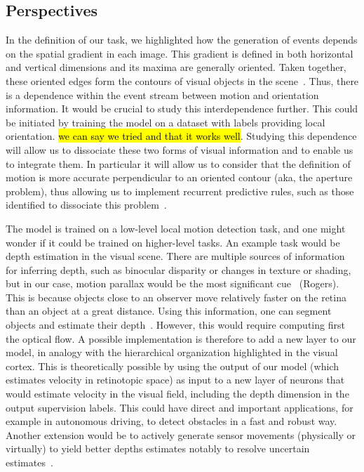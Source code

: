 \documentclass[default]{sn-jnl}%
\theoremstyle{thmstyleone}%
\theoremstyle{thmstyletwo}%
\theoremstyle{thmstylethree}%
\DeclareRobustCommand{\note}[1]{{\sethlcolor{yellow}\hl{#1}}}
\begin{document}
\subsection{Perspectives}
In the definition of our task, we highlighted how the generation of events depends on the spatial gradient in each image. This gradient is defined in both horizontal and vertical dimensions and its maxima are generally oriented. Taken together, these oriented edges form the contours of visual objects in the scene~\citep{koenderink_representation_1987}. Thus, there is a dependence within the event stream between motion and orientation information. It would be crucial to study this interdependence further. This could be initiated by training the model on a dataset with labels providing local orientation. \note{we can say we tried and that it works well}. Studying this dependence will allow us to dissociate these two forms of visual information and to enable us to integrate them. In particular it will allow us to consider that the definition of motion is more accurate perpendicular to an oriented contour (aka, the aperture problem), thus allowing us to implement recurrent predictive rules, such as those identified to dissociate this problem~\citep{perrinet_motion-based_2012}.

The model is trained on a low-level local motion detection task, and one might wonder if it could be trained on higher-level tasks. An example task would be depth estimation in the visual scene. There are multiple sources of information for inferring depth, such as binocular disparity or changes in texture or shading, but in our case, motion parallax would be the most significant cue~\citep{} (Rogers). This is because objects close to an observer move relatively faster on the retina than an object at a great distance. Using this information, one can segment objects and estimate their depth~\citep{yoonessi_contribution_2011}. However, this would require computing first the optical flow. A possible implementation is therefore to add a new layer to our model, in analogy with the hierarchical organization highlighted in the visual cortex. This is theoretically possible by using the output of our model (which estimates velocity in retinotopic space) as input to a new layer of neurons that would estimate velocity in the visual field, including the depth dimension in the output supervision labels. This could have direct and important applications, for example in autonomous driving, to detect obstacles in a fast and robust way. Another extension would be to actively generate sensor movements (physically or virtually) to yield better depths estimates notably to resolve uncertain estimates~\citep{nawrot_eye_2003}.
\end{document}
